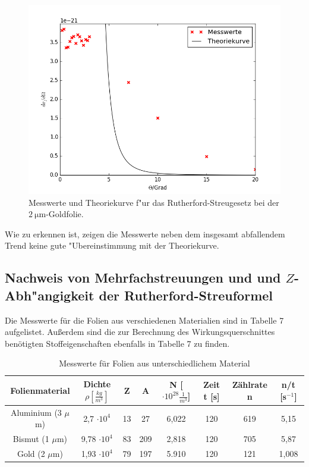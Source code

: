   \begin{figure}
    \centering
    \includegraphics[width=15cm]{skripte/ruther.png}
    \caption{Messwerte und Theoriekurve f"ur das Rutherford-Streugesetz bei der $\SI{2}{\micro \meter}$-Goldfolie.}
    \label{plot:ruther}
  \end{figure}

  Wie zu erkennen ist, zeigen die Messwerte neben dem insgesamt abfallendem Trend keine gute "Ubereinstimmung mit der Theoriekurve.

  \newpage



  \subsection{Nachweis von Mehrfachstreuungen und und $Z$-Abh"angigkeit der Rutherford-Streuformel}



Die Messwerte für die Folien aus verschiedenen Materialien sind in Tabelle 7 aufgelistet. Außerdem sind die zur Berechnung des Wirkungsquerschnittes benötigten Stoffeigenschaften ebenfalls in Tabelle 7 zu finden. 

\begin{table}[H] 
\centering
\begin{tabular}{c|c c c c c c c}

	Folienmaterial &Dichte $\rho [\frac{kg}{m^3}]$& Z & A & N [$\cdot 10^{28} \frac{1}{m^3}$]& Zeit t [s]& Zählrate n & n/t [s$^{-1}$]  \\ 
	\hline 
	Aluminium (3 $\mu$m) &2,7 $\cdot 10^{4}$& 13 & 27& 6,022 & 120  & 619 & 5,15  \\ 

	Bismut (1 $\mu$m)& 9,78 $\cdot 10^{4}$  & 83 & 209& 2,818 & 120 & 705 & 5,87 \\ 

	Gold (2 $\mu$m) & 1,93   $\cdot 10^{4}$ & 79 & 197 & 5.910 & 120 & 121 & 1,008 \\ 

\end{tabular} 
	\caption{Messwerte für Folien aus unterschiedlichem Material} 
\end{table}
 
